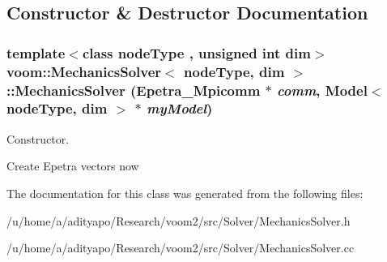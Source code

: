 \subsection{Constructor \& Destructor Documentation}
\hypertarget{classvoom_1_1_mechanics_solver_a78c3e2a12949f5ac7c0c8977c8e2adc0}{
\subsubsection[{MechanicsSolver}]{\setlength{\rightskip}{0pt plus 5cm}template$<$class nodeType , unsigned int dim$>$ {\bf voom::MechanicsSolver}$<$ nodeType, dim $>$::{\bf MechanicsSolver} (Epetra\_\-Mpicomm $\ast$ {\em comm}, \/  {\bf Model}$<$ nodeType, dim $>$ $\ast$ {\em myModel})}}
\label{classvoom_1_1_mechanics_solver_a78c3e2a12949f5ac7c0c8977c8e2adc0}


Constructor. 

Create Epetra vectors now 

The documentation for this class was generated from the following files:\begin{DoxyCompactItemize}
\item 
/u/home/a/adityapo/Research/voom2/src/Solver/MechanicsSolver.h\item 
/u/home/a/adityapo/Research/voom2/src/Solver/MechanicsSolver.cc\end{DoxyCompactItemize}
